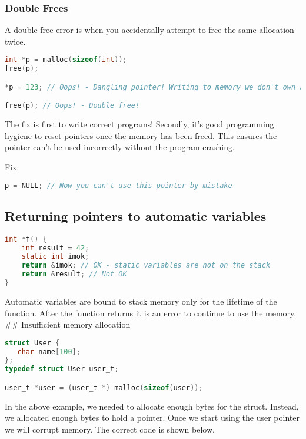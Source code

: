 \subsubsection{Double Frees}

A double free error is when you accidentally attempt to free the same allocation twice.

\begin{lstlisting}[language=C]
int *p = malloc(sizeof(int));
free(p);

*p = 123; // Oops! - Dangling pointer! Writing to memory we don't own anymore

free(p); // Oops! - Double free!
\end{lstlisting}

The fix is first to write correct programs! Secondly, it's good programming hygiene to reset pointers once the memory has been freed. This ensures the pointer can't be used incorrectly without the program crashing.

Fix:

\begin{lstlisting}[language=C]
p = NULL; // Now you can't use this pointer by mistake
\end{lstlisting}

\subsection{Returning pointers to automatic variables}

\begin{lstlisting}[language=C]
int *f() {
    int result = 42;
    static int imok;
    return &imok; // OK - static variables are not on the stack
    return &result; // Not OK
}
\end{lstlisting}

Automatic variables are bound to stack memory only for the lifetime of
the function. After the function returns it is an error to continue to
use the memory. \#\# Insufficient memory allocation

\begin{lstlisting}[language=C]
struct User {
   char name[100];
};
typedef struct User user_t;

user_t *user = (user_t *) malloc(sizeof(user));
\end{lstlisting}

In the above example, we needed to allocate enough bytes for the struct.
Instead, we allocated enough bytes to hold a pointer. Once we start
using the user pointer we will corrupt memory. The correct code is shown
below.

